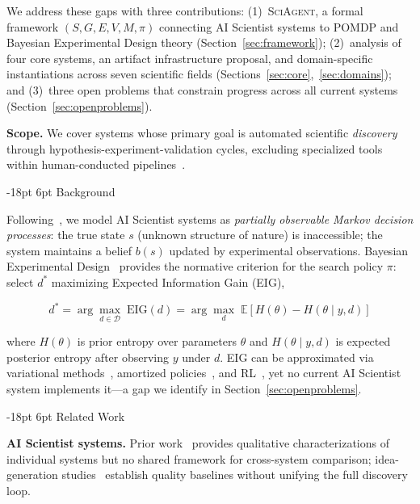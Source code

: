 \documentclass[11pt]{article}
\makeatletter
\renewcommand\section{\@startsection{section}{1}{\z@}%
  {-18pt \@plus -4pt \@minus -2pt}%
  {6pt \@plus 2pt}%
  {\normalfont\large\bfseries}}
\newcommand{\sgmvpi}{$(S, G, E, V, M, \pi)$}
\newcommand{\framework}{\textsc{SciAgent}}
\makeatother
\begin{document}
We address these gaps with three contributions: (1)~\framework{}, a formal framework \sgmvpi{} connecting AI Scientist systems to POMDP and Bayesian Experimental Design theory (Section~\ref{sec:framework}); (2)~analysis of four core systems, an artifact infrastructure proposal, and domain-specific instantiations across seven scientific fields (Sections~\ref{sec:core},~\ref{sec:domains}); and (3)~three open problems that constrain progress across all current systems (Section~\ref{sec:openproblems}).

\noindent\textbf{Scope.} We cover systems whose primary goal is automated scientific \emph{discovery} through hypothesis-experiment-validation cycles, excluding specialized tools within human-conducted pipelines~\citep{jumper2021alphafold}.

\section{Background}
\label{sec:background}

Following~\citet{kaelbling1998pomdp}, we model AI Scientist systems as \emph{partially observable Markov decision processes}: the true state $s$ (unknown structure of nature) is inaccessible; the system maintains a belief $b(s)$ updated by experimental observations. Bayesian Experimental Design~\citep{chaloner1995bayesian,rainforth2024modern} provides the normative criterion for the search policy $\pi$: select $d^*$ maximizing Expected Information Gain (EIG),

\begin{equation}
  d^* = \arg\max_{d \in \mathcal{D}}\; \mathrm{EIG}(d) = \arg\max_{d}\; \mathbb{E}\left[H(\theta) - H(\theta \mid y, d)\right]
  \label{eq:eid}
\end{equation}

where $H(\theta)$ is prior entropy over parameters $\theta$ and $H(\theta \mid y, d)$ is expected posterior entropy after observing $y$ under $d$. EIG can be approximated via variational methods~\citep{foster2019variational}, amortized policies~\citep{foster2021dad}, and RL~\citep{blau2022rl}, yet no current AI Scientist system implements it---a gap we identify in Section~\ref{sec:openproblems}.

\section{Related Work}
\label{sec:related}

\textbf{AI Scientist systems.} Prior work~\citep{lu2024aiscientist,lu2026aiscientist,schmidgall2025agentlab,boiko2023emergent} provides qualitative characterizations of individual systems but no shared framework for cross-system comparison; idea-generation studies~\citep{si2024novelideas,baek2024researchagent} establish quality baselines without unifying the full discovery loop.
\end{document}
